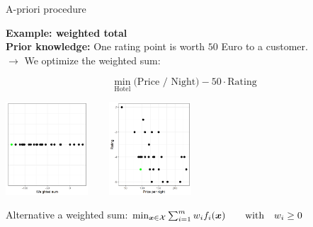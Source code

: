 \documentclass[11pt,compress,t,notes=noshow, xcolor=table]{beamer}
\begin{document}
\begin{vbframe}{A-priori procedure}

\textbf{Example: weighted total}\\
\textbf{Prior knowledge:} One rating point is worth $50$ Euro to a customer. \\
    $\to$ We optimize the weighted sum:

$$
\min_\text{Hotel} \text{(Price / Night)} - 50 \cdot \text{Rating}
$$


\begin{center}
\includegraphics[height=3.5cm, width =0.3\linewidth]{figure_man/priori1.png} ~~~ \includegraphics[height=3.5cm, width =0.35\linewidth]{figure_man/priori2.png}
\end{center}

%
%
%

Alternative a weighted sum: $\min_{\bm{x} \in \mathcal{X}} \sum_{i = 1}^m w_i f_i(\bm{x}) \qquad \text{with} \quad w_i \ge 0 $


\end{vbframe}
\end{document}
